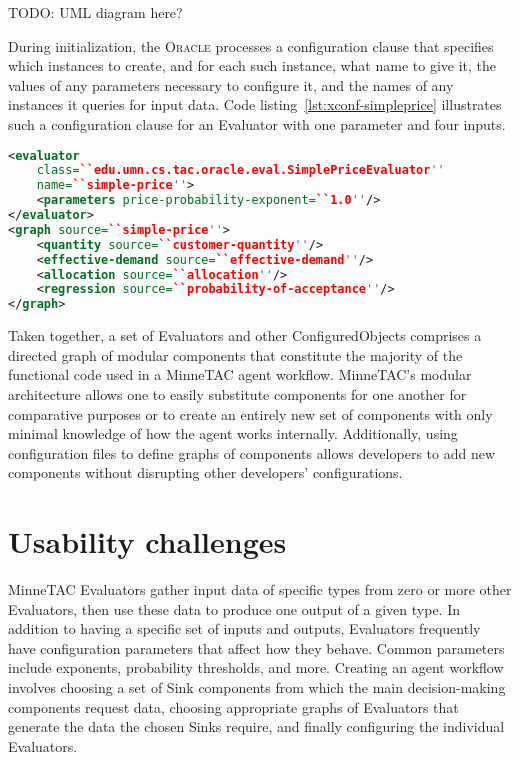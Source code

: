 \documentclass{article}
\begin{document}
TODO:  UML diagram here?

During initialization, the \textsc{Oracle} processes a configuration clause that specifies which instances to create, and for each such instance, what name to give it, the values of any parameters necessary to configure it, and the names of any instances it queries for input data.
Code listing~\ref{lst:xconf-simpleprice} illustrates such a configuration clause for an Evaluator with one parameter and four inputs.

{\small
\begin{lstlisting}[language={XML},frame={single},
label={lst:xconf-simpleprice},caption={Configuration clause for a price
evaluator that uses one parameter and several inputs}]
<evaluator
    class=``edu.umn.cs.tac.oracle.eval.SimplePriceEvaluator''
    name=``simple-price''>
    <parameters price-probability-exponent=``1.0''/>
</evaluator>
<graph source=``simple-price''>
    <quantity source=``customer-quantity''/>
    <effective-demand source=``effective-demand''/>
    <allocation source=``allocation''/>
    <regression source=``probability-of-acceptance''/>
</graph>
\end{lstlisting}
}

Taken together, a set of Evaluators and other ConfiguredObjects comprises a directed graph of modular components that constitute the majority of the functional code used in a MinneTAC agent workflow.
MinneTAC's modular architecture allows one to easily substitute components for one another for comparative purposes or to create an entirely new set of components with only minimal knowledge of how the agent works internally.
Additionally, using configuration files to define graphs of components allows developers to add new components without disrupting other developers' configurations.

\section{Usability challenges}
\label{sec:challenges}

MinneTAC Evaluators gather input data of specific types from zero or more other Evaluators, then use these data to produce one output of a given type.
In addition to having a specific set of inputs and outputs, Evaluators frequently have configuration parameters that affect how they behave.
Common parameters include exponents, probability thresholds, and more.
Creating an agent workflow involves choosing a set of Sink components from which the main decision-making components request data, choosing appropriate graphs of Evaluators that generate the data the chosen Sinks require, and finally configuring the individual Evaluators.~\cite{Collins08TR}
\end{document}
